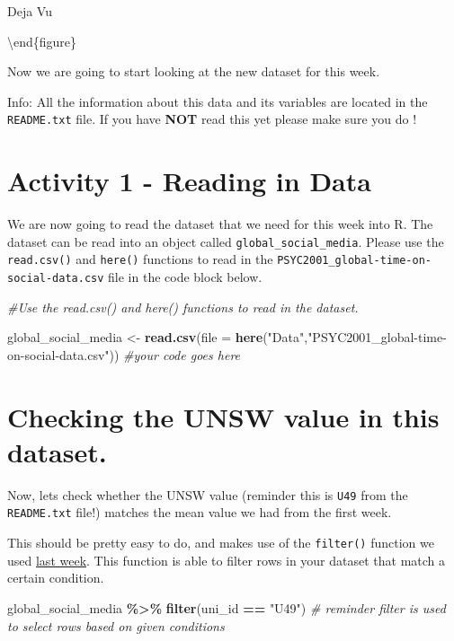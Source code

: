 \documentclass[
]{book}
\newenvironment{Shaded}{\begin{snugshade}}{\end{snugshade}}
\newcommand{\AttributeTok}[1]{\textcolor[rgb]{0.13,0.29,0.53}{#1}}
\newcommand{\CommentTok}[1]{\textcolor[rgb]{0.56,0.35,0.01}{\textit{#1}}}
\newcommand{\FunctionTok}[1]{\textcolor[rgb]{0.13,0.29,0.53}{\textbf{#1}}}
\newcommand{\NormalTok}[1]{#1}
\newcommand{\OtherTok}[1]{\textcolor[rgb]{0.56,0.35,0.01}{#1}}
\newcommand{\SpecialCharTok}[1]{\textcolor[rgb]{0.81,0.36,0.00}{\textbf{#1}}}
\newcommand{\StringTok}[1]{\textcolor[rgb]{0.31,0.60,0.02}{#1}}
\begin{document}
\caption{Deja Vu}

\label{fig:unnamed-chunk-29}
\textbackslash end\{figure\}

Now we are going to start looking at the new dataset for this week.

Info: All the information about this data and its variables are located in the \texttt{README.txt} file. If you have \textbf{NOT} read this yet please make sure you do !

\section{Activity 1 - Reading in Data}\label{activity-1---reading-in-data}

We are now going to read the dataset that we need for this week into R. The dataset can be read into an object called \texttt{global\_social\_media}. Please use the \texttt{read.csv()} and \texttt{here()} functions to read in the \texttt{PSYC2001\_global-time-on-social-data.csv} file in the code block below.

\begin{Shaded}
\begin{Highlighting}[]
\CommentTok{\#Use the read.csv() and here() functions to read in the dataset.}

\NormalTok{global\_social\_media }\OtherTok{\textless{}{-}} \FunctionTok{read.csv}\NormalTok{(}\AttributeTok{file =} \FunctionTok{here}\NormalTok{(}\StringTok{"Data"}\NormalTok{,}\StringTok{"PSYC2001\_global{-}time{-}on{-}social{-}data.csv"}\NormalTok{)) }\CommentTok{\#your code goes here}
\end{Highlighting}
\end{Shaded}

\section{Checking the UNSW value in this dataset.}\label{checking-the-unsw-value-in-this-dataset.}

Now, lets check whether the UNSW value (reminder this is \texttt{U49} from the \texttt{README.txt} file!) matches the mean value we had from the first week.

This should be pretty easy to do, and makes use of the \texttt{filter()} function we used \hyperref[cleaning-the-data]{last week}. This function is able to filter rows in your dataset that match a certain condition.

\begin{Shaded}
\begin{Highlighting}[]
\NormalTok{global\_social\_media }\SpecialCharTok{\%\textgreater{}\%} 
  \FunctionTok{filter}\NormalTok{(uni\_id }\SpecialCharTok{==} \StringTok{"U49"}\NormalTok{) }\CommentTok{\# reminder filter is used to select rows based on given conditions}
\end{Highlighting}
\end{Shaded}
\end{document}
